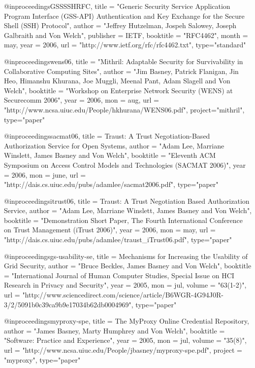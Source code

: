 @inproceedings{GSSSSHRFC,
title   = "{G}eneric {S}ecurity {S}ervice {A}pplication {P}rogram {I}nterface ({GSS-API}) {A}uthentication and {K}ey {E}xchange for the {S}ecure {S}hell ({SSH}) {P}rotocol",
author = "Jeffrey Hutzelman, Jospeh Salowey, Joseph Galbraith and Von Welch",
publisher = IETF,
booktitle = "RFC4462",
month = may,
year = {2006},
url = "http://www.ietf.org/rfc/rfc4462.txt",
type="standard"
}


@inproceedings{wens06,
title   = "{M}ithril: {A}daptable {S}ecurity for {S}urvivability in {C}ollaborative {C}omputing {S}ites",
author = "Jim Basney, Patrick Flanigan, Jin Heo, Himanshu Khurana, Joe Muggli, Meenal Pant, Adam Slagell and Von Welch",
booktitle = "Workshop on Enterprise Network Security (WENS) at Securecomm 2006",
year = {2006},
mon = aug,
url = "http://www.ncsa.uiuc.edu/People/hkhurana/WENS06.pdf",
project="mithril",
type="paper"
}

@inproceedings{sacmat06,
title   = {Traust: A Trust Negotiation-Based Authorization Service for Open Systems},
author = "Adam Lee, Marriane Winslett, James Basney and Von Welch",
booktitle = "Eleventh ACM Symposium on Access Control Models and Technologies (SACMAT 2006)",
year = {2006},
mon = june,
url = "http://dais.cs.uiuc.edu/pubs/adamlee/sacmat2006.pdf",
type="paper"
}

@inproceedings{itrust06,
title   = {Traust: A Trust Negotiation Based Authorization Service},
author = "Adam Lee, Marriane Winslett, James Basney and Von Welch",
booktitle = "Demonstration Short Paper, The Fourth International Conference on Trust Management (iTrust 2006)",
year = {2006},
mon = may,
url = "http://dais.cs.uiuc.edu/pubs/adamlee/traust_iTrust06.pdf",
type="paper"
}

@inproceedings{gs-usability-se,
title   = {Mechanisms for Increasing the Usability of Grid Security},
author = "Bruce Beckles, James Basney and Von Welch",
booktitle = "International Journal of Human Computer Studies, Special Issue on HCI Research in Privacy and Security",
year = {2005},
mon = jul,
volume = "63(1-2)",
url = "http://www.sciencedirect.com/science/article/B6WGR-4G94J0R-3/2/5091b0c39ca9b9e17034b62db0004969",
type="paper"
}

@inproceedings{myproxy-spe,
title   = {The MyProxy Online Credential Repository},
author = "James Basney, Marty Humphrey and Von Welch",
booktitle = "Software: Practice and Experience",
year = {2005},
mon = jul,
volume = "35(8)",
url = "http://www.ncsa.uiuc.edu/People/jbasney/myproxy-spe.pdf",
project = "myproxy",
type="paper"
}

